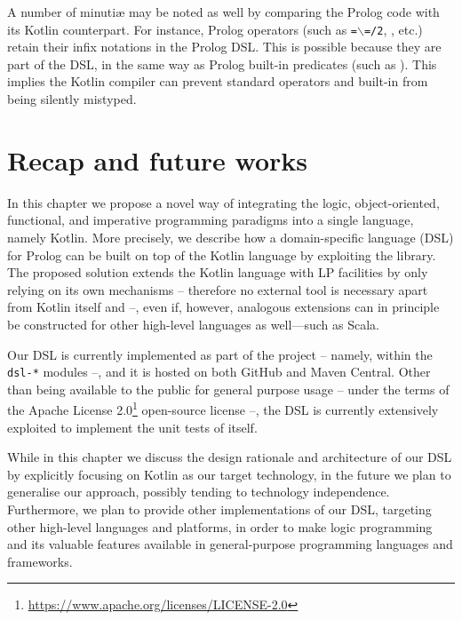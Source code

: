 \documentclass[12pt,a4paper,openright,twoside]{book}
\begin{document}
A number of minuti\ae{} may be noted as well by comparing the Prolog code with its Kotlin counterpart.
%
For instance, Prolog operators (such as \texttt{=$\backslash$=/2}, , etc.) retain their infix notations in the Prolog DSL.
%
This is possible because they are part of the DSL, in the same way as Prolog built-in predicates (such as ).
%
This implies the Kotlin compiler can prevent standard operators and built-in from being silently mistyped.

\section{Recap and future works}\label{sec:conclusions}

In this chapter we propose a novel way of integrating the logic, object-oriented, functional, and imperative programming paradigms into a single language, namely Kotlin.
%
More precisely, we describe how a domain-specific language (DSL) for Prolog can be built on top of the Kotlin language by exploiting the \twopkt{} library.
%
The proposed solution extends the Kotlin language with LP facilities by only relying on its own mechanisms -- therefore no external tool is necessary apart from Kotlin itself and \twopkt{} --, even if, however, analogous extensions can in principle be constructed for other high-level languages as well---such as Scala.

Our DSL is currently implemented as part of the \twopkt{} project -- namely, within the \texttt{dsl-*} modules --, and it is hosted on both GitHub \cite{homepage2PKt} and Maven Central.
%
Other than being available to the public for general purpose usage -- under the terms of the Apache License 2.0\footnote{\url{https://www.apache.org/licenses/LICENSE-2.0}} open-source license --, the DSL is currently extensively exploited to implement the unit tests of \twopkt{} itself.

While in this chapter we discuss the design rationale and architecture of our DSL by explicitly focusing on Kotlin as our target technology, in the future we plan to generalise our approach, possibly tending to technology independence.
%
Furthermore, we plan to provide other implementations of our DSL, targeting other high-level languages and platforms, in order to make logic programming and its valuable features available in general-purpose programming languages and frameworks.
\end{document}
